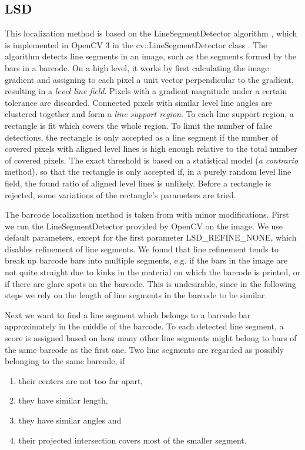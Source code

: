 \subsection{LSD}\label{sec:LSD}
This localization method is based on the LineSegmentDetector algorithm
\cite{GromponevonGioi2012}, which is implemented in OpenCV 3 in the
cv::LineSegmentDetector class \cite{Bradski2017}. The algorithm detects line
segments in an image, such as the segments formed by the bars in a barcode.
On a high level, it works by first calculating the image gradient and assigning
to each pixel a unit vector perpendicular to the gradient, resulting in a
\emph{level line field}. Pixels with a gradient magnitude under a certain
tolerance are discarded. Connected pixels with similar level line angles are clustered
together and form a \emph{line support region}. To each line support region, a
rectangle is fit which covers the whole region. To limit the number of false
detections, the rectangle is only accepted as a line segment if the number of
covered pixels with aligned level lines is high enough relative to the total number of
covered pixels. The exact threshold is based on a statistical model (\emph{a
  contrario} method), so that the rectangle is only accepted if,
in a purely random level line field, the found ratio of aligned level lines is unlikely.
Before a rectangle is rejected, some variations of the rectangle's parameters
are tried.

The barcode localization method is taken from \citeauthor{Creusot2016} \cite{Creusot2016} with minor modifications. First we run
the LineSegmentDetector provided by OpenCV on the image. We use default
parameters, except for the first parameter LSD\_REFINE\_NONE, which disables
refinement of line segments. We found that line refinement tends to break up
barcode bars into multiple segments, e.g. if the bars in the image are not quite
straight due to kinks in the material on which the barcode is printed, or if
there are glare spots on the barcode. This is undesirable, since in the
following steps we rely on the length of line segments in the barcode to be similar.

Next we want to find a line segment which belongs to a barcode bar approximately
in the middle of the barcode. To each detected line segment, a score is assigned
based on how many other line segments might belong to bars of the same barcode as the first
one. Two line segments are regarded as possibly belonging to the same barcode, if
\begin{enumerate}
\item their centers are not too far apart,
\item they have similar length,
\item they have similar angles and
\item their projected intersection covers most of the smaller segment.
\end{enumerate}

